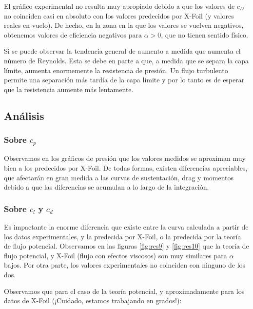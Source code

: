 \documentclass{article}
\begin{document}
El gráfico experimental no resulta muy apropiado debido a que los valores de $c_D$ no coinciden casi en absoluto con 
los valores predecidos por X-Foil (y valores reales en vuelo). De hecho, en la zona en la que los valores se vuelven negativos,
obtenemos valores de eficiencia negativos para $\alpha > 0$, que no tienen sentido físico.

Si se puede observar la tendencia general de aumento a medida que aumenta el número de Reynolds. Esta se debe en parte a 
que, a medida que se separa la capa límite, aumenta enormemente la resistencia de presión. Un flujo turbulento permite una 
separación más tardía de la capa límite \cite{Tritton1988-ei} y por lo tanto es de esperar que la resistencia aumente 
más lentamente.

\subsection{Análisis}

\subsubsection{Sobre \texorpdfstring{$c_{p}$}{presiones}}

Observamos en los gráficos de presión que los valores medidos se aproximan muy bien a los predecidos 
por X-Foil. De todas formas, existen diferencias apreciables, que afectarán en gran medida a las curvas 
de sustentación, drag y momentos debido a que las diferencias se acumulan a lo largo de la integración.


\subsubsection{Sobre \texorpdfstring{$c_{l}$}{lift} y \texorpdfstring{$c_d$}{drag}}

\label{discus}

Es impactante la enorme diferencia que existe entre la curva calculada a partir de los datos experimentales, 
y la predecida por X-Foil, o la predecida por la teoría de flujo potencial. Observamos en las figuras \ref{fig:res9} y 
\ref{fig:res10} que la teoría de flujo potencial, y X-Foil (flujo con efectos viscosos) son muy similares 
para $\alpha$ bajos. Por otra parte, los valores experimentales no coinciden con ninguno de los dos.

Observamos que para el caso de la teoría potencial, y aproximadamente para los datos de X-Foil (¡Cuidado, estamos trabajando
en grados!):
\end{document}
